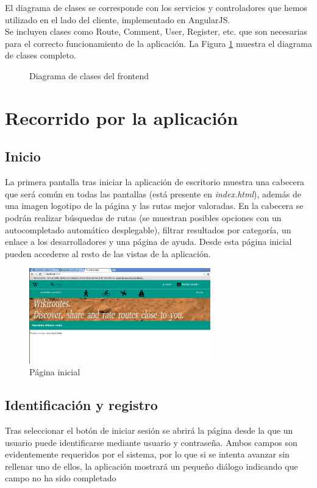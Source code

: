 \documentclass[11pt,a4paper]{article}
\begin{document}
El diagrama de clases se corresponde con los servicios y controladores que hemos utilizado en el lado del cliente, implementado en AngularJS.\\

Se incluyen clases como Route, Comment, User, Register, etc. que son necesarias para el correcto funcionamiento de la aplicación. La Figura \ref{fig:clasesfrontend} muestra el diagrama de clases completo.

\begin{figure}
\centering
\clasesfrontend
\caption{Diagrama de clases del frontend}
\label{fig:clasesfrontend}
\end{figure}


\clearpage

\section{Recorrido por la aplicación}
\subsection{Inicio}
La primera pantalla tras iniciar la aplicación de escritorio muestra una cabecera que será común en todas las pantallas (está presente en \textit{index.html}), además de una imagen logotipo de la página y las rutas mejor valoradas. En la cabecera se podrán realizar búsquedas de rutas (se muestran posibles opciones con un autocompletado automático desplegable), filtrar resultados por categoría, un enlace a los desarrolladores y una página de ayuda. Desde esta página inicial pueden accederse al resto de las vistas de la aplicación.
\begin{figure}[h]
\centering
  \includegraphics[width=0.7\textwidth]{./imagenes/inicial}
  \caption{Página inicial}
  \label{fig: Página inicial}
\end{figure}
\subsection{Identificación y registro}
Tras seleccionar el botón de iniciar sesión se abrirá la página desde la que un usuario puede identificarse mediante usuario y contraseña. Ambos campos son evidentemente requeridos por el sistema, por lo que si se intenta avanzar sin rellenar uno de ellos, la aplicación mostrará un pequeño diálogo indicando que campo no ha sido completado
\end{document}
